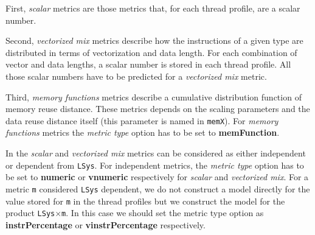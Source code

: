 \documentclass[a4paper, 10pt]{article}
\begin{document}
First, \textit{scalar} metrics are those metrics that, for each thread profile, are a scalar number.

Second, \textit{vectorized mix} metrics describe how the instructions of a given type
are distributed in terms of vectorization and data length. For each combination of vector and data lengths, a scalar number is stored
in each thread profile. All those scalar numbers have to be predicted for a \textit{vectorized mix} metric.

Third, \textit{memory functions} metrics describe a cumulative distribution function of memory reuse distance.
These metrics depends on the scaling parameters and the data reuse distance itself (this parameter is named in \ex \verb!memX!).
For \textit{memory functions} metrics the \textit{metric type} option has to be set to \textbf{memFunction}.

In \ex the \textit{scalar} and \textit{vectorized mix} metrics can be considered as either independent or dependent from \verb!LSys!.
For independent metrics, the \textit{metric type} option has to be set to \textbf{numeric} or \textbf{vnumeric}
respectively for \textit{scalar} and \textit{vectorized mix}. For a metric \verb!m! considered \verb!LSys! dependent,
we do not construct a model directly for the value stored for \verb!m! in the thread profiles but we construct
the model for the product \verb!LSys!$\times$\verb!m!. In this case
we should set the metric type option as \textbf{instrPercentage} or \textbf{vinstrPercentage}
respectively.
\end{document}
